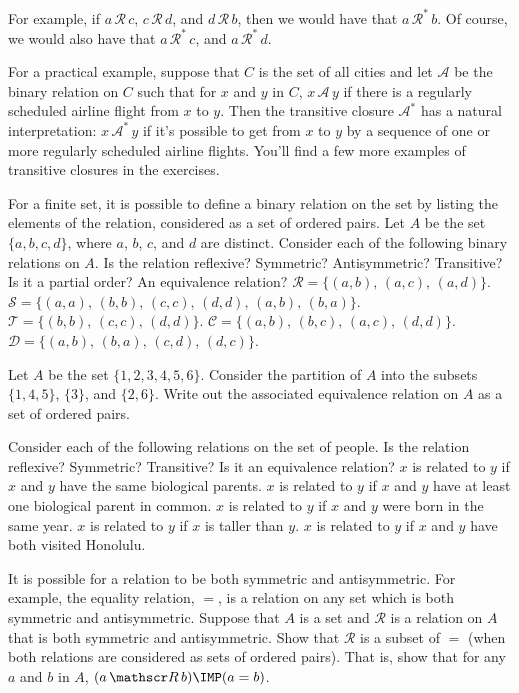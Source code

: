 For example, if $a\,{\mathscr R}\,c$, $c\,{\mathscr R}\,d$, and
$d\,{\mathscr R}\,b$, then we would have that $a\,{\mathscr R}^*\,b$.
Of course, we would also have that $a\,{\mathscr R}^*\,c$, and
$a\,{\mathscr R}^*\,d$.

For a practical example, suppose that $C$ is the set of all cities
and let $\mathscr A$ be the binary relation on $C$ such that
for $x$ and $y$ in $C$, $x\,{\mathscr A}\,y$ if there is a
regularly scheduled airline flight from $x$ to $y$.
Then the transitive closure ${\mathscr A}^*$ has a natural
interpretation: $x\,{\mathscr A}^*\,y$ if it's possible
to get from $x$ to $y$ by a sequence of one or more regularly
scheduled airline flights.  You'll find a few more examples
of transitive closures in the exercises.



\begin{exercises}

\problem For a finite set, it is possible to define a binary relation on
the set by listing the elements of the relation, considered as a set
of ordered pairs.  Let $A$ be the set $\{a,b,c,d\}$, where $a$,
$b$, $c$, and $d$ are distinct.  Consider
each of the following binary relations on $A$.  Is the relation
reflexive?  Symmetric?  Antisymmetric?  Transitive?  Is it a 
partial order?  An equivalence relation?
\ppart ${\mathscr R}=\{ (a,b),\, (a,c),\, (a,d) \}$.
\ppart ${\mathscr S}=\{ (a,a),\, (b,b),\, (c,c),\, (d,d),\, (a,b),\, (b,a) \}$.
\ppart ${\mathscr T}=\{ (b,b),\,  (c,c),\, (d,d)\}$.
\ppart ${\mathscr C}=\{ (a,b),\, (b,c),\, (a,c),\, (d,d)\}$.
\ppart ${\mathscr D}=\{ (a,b),\, (b,a),\, (c,d),\, (d,c)\}$.

\problem Let $A$ be the set $\{1,2,3,4,5,6\}$.  Consider the
partition of $A$ into the subsets $\{1,4,5\}$, $\{3\}$, and $\{2,6\}$.
Write out the associated equivalence relation on $A$ as a set
of ordered pairs.

\problem Consider each of the following relations on the set of people.
Is the relation reflexive? Symmetric? Transitive?
Is it an equivalence relation?
\ppart $x$ is related to $y$ if $x$ and $y$ have the same biological parents.
\ppart $x$ is related to $y$ if $x$ and $y$ have at least one biological parent
in common.
\ppart $x$ is related to $y$ if $x$ and $y$ were born in the same year.
\ppart $x$ is related to $y$ if $x$ is taller than $y$.
\ppart $x$ is related to $y$ if $x$ and $y$ have both visited Honolulu.

\problem It is possible for a relation to be both symmetric and
antisymmetric.  For example, the equality relation, $=$, is
a relation on any set which is both symmetric and antisymmetric.
Suppose that $A$ is a set and $\mathscr R$ is a relation on $A$ that
is both symmetric and antisymmetric.  Show that $\mathscr R$ is
a subset of $=$ (when both relations are considered as sets of
ordered pairs).  That is, show that for any $a$ and $b$ in $A$,
$(a\,{\mathscr R}\,b)\IMP (a=b)$.


\end{exercises}
